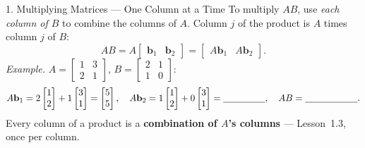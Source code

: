 \documentclass[10pt]{article}
\begin{document}
\begin{notesbox}{1. Multiplying Matrices --- One Column at a Time}
To multiply $AB$, use \emph{each column of $B$} to combine the columns of $A$. Column $j$ of the
product is $A$ times column $j$ of $B$:
\[
  AB = A\begin{bmatrix} \mathbf{b}_1 & \mathbf{b}_2 \end{bmatrix}
  = \begin{bmatrix} A\mathbf{b}_1 & A\mathbf{b}_2 \end{bmatrix}.
\]
\textit{Example.} $A=\begin{bmatrix} 1 & 3 \\ 2 & 1 \end{bmatrix}$,
$B=\begin{bmatrix} 2 & 1 \\ 1 & 0 \end{bmatrix}$:
\[
  A\mathbf{b}_1 = 2\begin{bmatrix} 1\\2 \end{bmatrix}+1\begin{bmatrix} 3\\1 \end{bmatrix}=\begin{bmatrix} 5\\5 \end{bmatrix},
  \quad
  A\mathbf{b}_2 = 1\begin{bmatrix} 1\\2 \end{bmatrix}+0\begin{bmatrix} 3\\1 \end{bmatrix}=\blank{1.6cm},
  \quad AB=\blank{2.0cm}.
\]
Every column of a product is a \textbf{combination of $A$'s columns} --- Lesson~1.3, once per column.
\end{notesbox}
\end{document}

